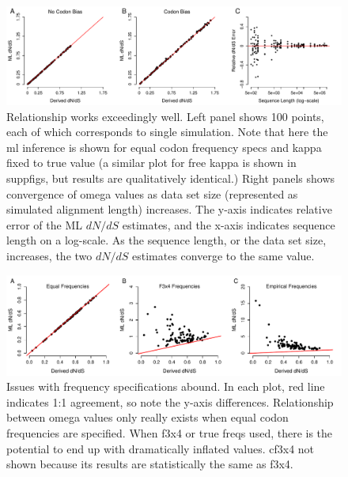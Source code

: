 \documentclass[11pt]{article}
\begin{document}
\begin{figure}[H]
\centerline{\includegraphics[width=6in]{figures/regression_convergence.pdf}}
\caption{\label{reg_conv} Relationship works exceedingly well. Left panel shows 100 points, each of which corresponds to single simulation. Note that here the ml inference is shown for equal codon frequency specs and kappa fixed to true value (a similar plot for free kappa is shown in suppfigs, but results are qualitatively identical.) Right panels shows convergence of omega values as data set size (represented as simulated alignment length) increases. The y-axis indicates relative error of the ML $dN/dS$ estimates, and the x-axis indicates sequence length on a log-scale. As the sequence length, or the data set size, increases, the two $dN/dS$ estimates converge to the same value. }
\end{figure}

\bigskip
\begin{figure}[H]
\centerline{\includegraphics[width=6in]{figures/regression_fspecs.pdf}}
\caption{\label{reg_fspec} Issues with frequency specifications abound. In each plot, red line indicates 1:1 agreement, so note the y-axis differences. Relationship between omega values only really exists when equal codon frequencies are specified. When f3x4 or true freqs used, there is the potential to end up with dramatically inflated values. cf3x4 not shown because its results are statistically the same as f3x4.}
\end{figure}
\end{document}

